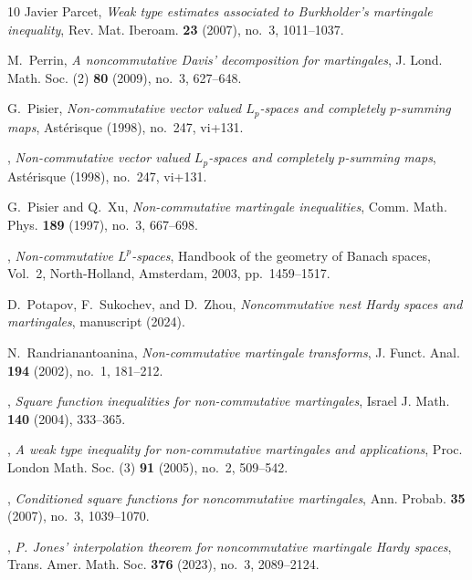 \documentclass[11]{amsart}
\numberwithin{equation}{section}
\begin{document}
\begin{thebibliography}{10}
	Javier Parcet, \emph{Weak type estimates associated to {B}urkholder's
		martingale inequality}, Rev. Mat. Iberoam. \textbf{23} (2007), no.~3,
	1011--1037. 
	
	M.~Perrin, \emph{A noncommutative {D}avis' decomposition for martingales}, J.
	Lond. Math. Soc. (2) \textbf{80} (2009), no.~3, 627--648. 
	
	G.~Pisier, \emph{Non-commutative vector valued {$L_p$}-spaces and completely
		{$p$}-summing maps}, Ast\'erisque (1998), no.~247, vi+131. 
	
	\bysame, \emph{Non-commutative vector valued {$L_p$}-spaces and completely
		{$p$}-summing maps}, Ast\'erisque (1998), no.~247, vi+131. 
	
	G.~Pisier and Q.~Xu, \emph{Non-commutative martingale inequalities}, Comm.
	Math. Phys. \textbf{189} (1997), no.~3, 667--698. 
	
	\bysame, \emph{Non-commutative {$L^p$}-spaces}, Handbook of the geometry of
	{B}anach spaces, {V}ol.\ 2, North-Holland, Amsterdam, 2003, pp.~1459--1517.
	
	D.~Potapov, F.~Sukochev, and D.~Zhou, \emph{Noncommutative nest {H}ardy spaces
		and martingales}, manuscript (2024).
	
	N.~Randrianantoanina, \emph{Non-commutative martingale transforms}, J. Funct.
	Anal. \textbf{194} (2002), no.~1, 181--212. 
	
	\bysame, \emph{Square function inequalities for non-commutative martingales},
	Israel J. Math. \textbf{140} (2004), 333--365. 
	
	\bysame, \emph{A weak type inequality for non-commutative martingales and
		applications}, Proc. London Math. Soc. (3) \textbf{91} (2005), no.~2,
	509--542. 
	
	\bysame, \emph{Conditioned square functions for noncommutative martingales},
	Ann. Probab. \textbf{35} (2007), no.~3, 1039--1070. 
	
	\bysame, \emph{P. {J}ones' interpolation theorem for noncommutative martingale
		{H}ardy spaces}, Trans. Amer. Math. Soc. \textbf{376} (2023), no.~3,
	2089--2124. 
	

\end{thebibliography}
\end{document}
